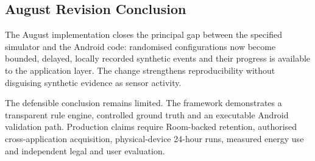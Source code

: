 
\subsection{August Revision Conclusion}

The August implementation closes the principal gap between the specified simulator and the Android code: randomised configurations now become bounded, delayed, locally recorded synthetic events and their progress is available to the application layer. The change strengthens reproducibility without disguising synthetic evidence as sensor activity.

The defensible conclusion remains limited. The framework demonstrates a transparent rule engine, controlled ground truth and an executable Android validation path. Production claims require Room-backed retention, authorised cross-application acquisition, physical-device 24-hour runs, measured energy use and independent legal and user evaluation.

